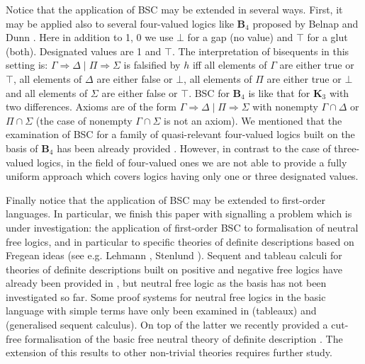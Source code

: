 \documentclass[11pt,a4paper,titlepage]{article}
\theoremstyle{definition}
\newcommand{\3}{\vspace{.3in}}
\newcommand{\2}{\vspace{.2in}}
\newcommand{\1}{\vspace{.1in}}
\newcommand{\5}{\vspace{.05in}}
\begin{document}
Notice that the application of BSC may be extended in several ways. First, it may be applied also to several four-valued logics like {\bf B$_4$} proposed by Belnap \cite{Belnap77a,Belnap77b} and Dunn \cite{Dunn76}. Here in addition to 1, 0 we use $\bot $ for a gap (no value) and $\top $ for a glut (both). Designated values are 1 and $\top $.
The interpretation of bisequents in this setting is: $\Gamma\Rightarrow\Delta \mid \Pi\Rightarrow\Sigma$ is falsified by $h$ iff all elements of $\Gamma$ are either true or $\top$, all elements of $\Delta$ are either false or $\bot$, all elements of $\Pi$ are either true or $\bot$ and all elements of $\Sigma$ are either false or $\top$.  BSC for {\bf B$_4$} is like that for {\bf K$_3$} with two differences. Axioms are of the form $\Gamma\Rightarrow\Delta \mid \Pi\Rightarrow\Sigma$ with nonempty  $\Gamma\cap\Delta$ or $\Pi\cap\Sigma$ (the case of nonempty $\Gamma\cap\Sigma$ is not an axiom). 
We mentioned that the examination of BSC for a family of quasi-relevant four-valued logics built on the basis of {\bf B$_4$} has been already provided \cite{Indrzejczak3}. However, in contrast to the case of three-valued logics, in the field of four-valued ones we are not able to provide a fully uniform approach which covers logics having only one or three designated values.


Finally notice that the application of BSC may be extended to first-order languages.  In particular, we finish this paper with signalling a problem which is under investigation: the application of first-order BSC to formalisation of neutral free logics, and in particular to specific theories of definite descriptions based on Fregean ideas (see e.g. Lehmann \cite{Lehmann}, Stenlund \cite{Stenlund}). 
Sequent and tableau calculi for theories of definite descriptions built on positive and negative free logics have already been provided in \cite{Indrzejczak2020b,Indrzejczak2021c,IndZaw1}, but neutral free logic as the basis has not been investigated so far. Some proof systems for neutral free logics in the basic language with simple terms have only been examined in \cite{Lehmann} (tableaux) and \cite{PavlovicGratzl23} (generalised sequent calculus). On top of the latter we recently provided a cut-free formalisation of the basic free neutral theory of definite description \cite{IndPet}. The extension of this results to other non-trivial theories requires further study.



\bigskip
\end{document}
